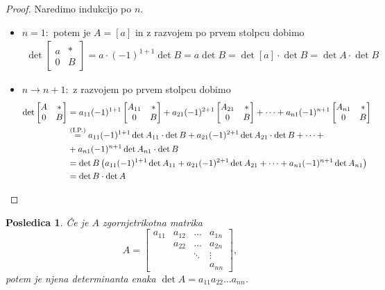 \documentclass[10pt, a4paper]{article}
\newtheorem{posledica}[izr]{Posledica}
\newenvironment{noticeC}{%
  \tcolorbox[%
  notitle,
  empty,
  enhanced,  %
  breakable,
  coltext=black, 
  fontupper=\rmfamily,
  parbox=false,
  noparskip,
  sharp corners,
  boxrule=-1pt,  %
  frame hidden,
  left=7pt,  %
  right=7pt,
  top=5pt,
  bottom=5pt,
  before skip=2.5ex plus 2pt,
  after skip=2.5ex plus 2pt,
  overlay unbroken and last={%
  },
  ]}
{\endtcolorbox}
\newenvironment{dokaz}%
  {\begin{noticeC}\begin{proof}}%
  {\end{proof}\end{noticeC}}
\begin{document}
\begin{dokaz}
    Naredimo indukcijo po $n$.\begin{itemize}
        \item $n = 1:$ potem je $A = [a]$ in z razvojem po prvem stolpcu dobimo
        \begin{align*}
            \det \begin{bmatrix}
                a & *\\
                0 & B
            \end{bmatrix} = a \cdot (-1)^{1+1} \det B = a \det B = \det [a] \cdot \det B = \det A \cdot \det B
        \end{align*}
        \item $n \rightarrow n+1:$ z razvojem po prvem stolpcu dobimo
        \begin{align*}
            \det \begin{bmatrix}
                A & *\\
                0 & B
            \end{bmatrix} &=
            a_{11} (-1)^{1+1} \begin{bmatrix}
                A_{11} & *\\
                0 & B
            \end{bmatrix} + a_{21} (-1)^{2+1} \begin{bmatrix}
                A_{21} & *\\
                0 & B
            \end{bmatrix} + \dots + 
            a_{n1} (-1)^{n+1} \begin{bmatrix}
                A_{n1} & *\\
                0 & B
            \end{bmatrix}\\
            &\stackrel{\text{(I.P.)}}{=} a_{11} (-1)^{1+1} \det A_{11} \cdot \det B + a_{21} (-1)^{2+1} \det A_{21}\cdot \det B + \dots +\\ 
            &+ a_{n1} (-1)^{n+1} \det A_{n1} \cdot \det B\\
            &= \det B \left(a_{11} (-1)^{1+1} \det A_{11} + a_{21} (-1)^{2+1} \det A_{21} + \dots + a_{n1} (-1)^{n+1} \det A_{n1} \right)\\
            &= \det B \cdot \det A \qedhere
        \end{align*}
    \end{itemize}
\end{dokaz}

\begin{posledica}
    Če je $A$ zgornjetrikotna matrika
    $$A = \begin{bmatrix}
        a_{11} & a_{12} &  \dots & a_{1n}\\
         & a_{22} & \dots & a_{2n}\\
         & & \ddots & \vdots \\
         & & & a_{nn}
    \end{bmatrix},$$
    potem je njena determinanta enaka $\det A = a_{11} a_{22} \dots a_{nn}$.
\end{posledica}
\end{document}

